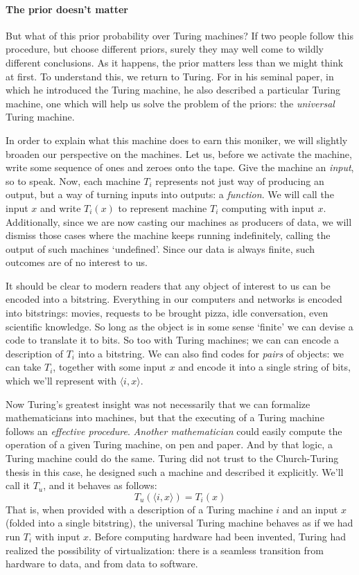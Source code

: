 
\paragraph{The prior doesn't matter}

But what of this prior probability over Turing machines? If two people follow this procedure, but choose different priors, surely they may well come to wildly different conclusions. As it happens, the prior matters less than we might think at first. To understand this, we return to Turing. For in his seminal paper, in which he introduced the Turing machine, he also described a particular Turing machine, one which will help us solve the problem of the priors: the \emph{universal} Turing machine.


In order to explain what this machine does to earn this moniker, we will slightly broaden our perspective on the machines. Let us, before we activate the machine, write some sequence of ones and zeroes onto the tape. Give the machine an \emph{input}, so to speak. Now, each machine $T_i$ represents not just way of producing an output, but a way of turning inputs into outputs: a \emph{function}. We will call the input $x$ and write $T_i(x)$ to represent machine $T_i$ computing with input $x$. Additionally, since we are now casting our machines as producers of data, we will dismiss those cases where the machine keeps running indefinitely, calling the output of such machines `undefined'. Since our data is always finite, such outcomes are of no interest to us.

It should be clear to modern readers that any object of interest to us can be encoded into a bitstring. Everything in our computers and networks is encoded into bitstrings: movies, requests to be brought pizza, idle conversation, even scientific knowledge. So long as the object is in some sense `finite' we can devise a code to translate it to bits. So too with Turing machines; we can can encode a description of $T_i$ into a bitstring. We can also find codes for \emph{pairs} of objects: we can take $T_i$, together with some input $x$ and encode it into a single string of bits, which we'll represent with $\langle i, x\rangle$.

Now Turing's greatest insight was not necessarily that we can formalize mathematicians into machines, but that the executing of a Turing machine follows an \emph{effective procedure}. \emph{Another mathematician} could easily compute the operation of a given Turing machine, on pen and paper. And by that logic, a Turing machine could do the same. Turing did not trust to the Church-Turing thesis in this case, he designed such a machine and described it explicitly. We'll call it $T_u$, and it behaves as follows:
\[
T_u(\langle i, x\rangle) = T_i(x)
\]  
That is, when provided with a description of a Turing machine $i$ and an input $x$ (folded into a single bitstring), the universal Turing machine behaves as if we had run $T_i$ with input $x$. Before computing hardware had been invented, Turing had realized the possibility of virtualization: there is a seamless transition from hardware to data, and from data to software. 

